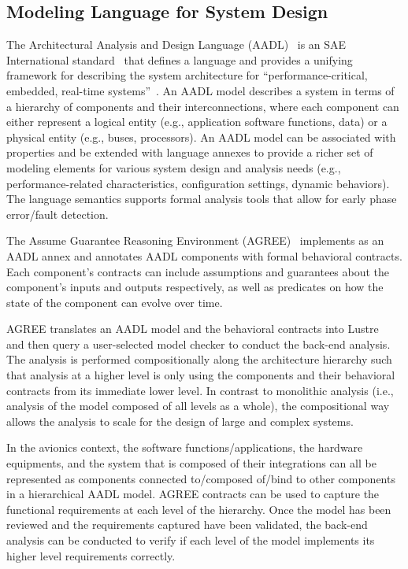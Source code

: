 \subsection{Modeling Language for System Design}
\label{subsec:aadl-agree}
The Architectural Analysis and Design Language (AADL)~\cite{FeilerModelBasedEngineering2012} is an SAE International standard~\cite{AADL_Standard} that defines a language and provides a unifying framework for describing the system architecture for ``performance-critical, embedded, real-time systems''~\cite{AADL_Standard}. An AADL model describes a system in terms of a hierarchy of components and their interconnections, where each component can either represent a logical entity (e.g., application software functions, data) or a physical entity (e.g., buses, processors). An AADL model can be associated with properties and be extended with language annexes to provide a richer set of modeling elements for various system design and analysis needs (e.g., performance-related characteristics, configuration settings, dynamic behaviors). The language semantics supports formal analysis tools that allow for early phase error/fault detection.

The Assume Guarantee Reasoning
Environment (AGREE)~\cite{NFM2012:CoGaMiWhLaLu} implements as an AADL annex and annotates AADL components with formal behavioral contracts. Each component's contracts can include assumptions and guarantees about the component's inputs and outputs respectively, as well as predicates on how the state of the component can evolve over time.

AGREE translates an AADL model and the behavioral contracts into Lustre~\cite{Halbwachs91:IEEE} and then query a user-selected
model checker to conduct the back-end analysis. The analysis is performed compositionally along the architecture hierarchy such that analysis at a higher level is only using the components and their behavioral contracts from its immediate lower level. In contrast to monolithic analysis (i.e., analysis of the model composed of all levels as a whole), the compositional way allows the analysis to scale for the design of large and complex systems. 

In the avionics context, the software functions/applications, the hardware equipments, and the system that is composed of their integrations can all be represented as components connected to/composed of/bind to other components in a hierarchical AADL model. AGREE contracts can be used to capture the functional requirements at each level of the hierarchy. Once the model has been reviewed and the requirements captured have been validated, the back-end analysis can be conducted to verify if each level of the model implements its higher level requirements correctly.


